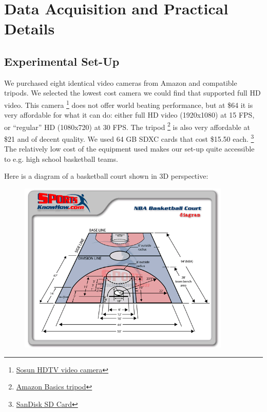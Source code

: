 \documentclass{article}
\begin{document}
\newpage
\section{Data Acquisition and Practical Details}
\subsection{Experimental Set-Up}
We purchased eight identical video cameras from Amazon and compatible tripods.
We selected the lowest cost camera we could find that supported full HD video.
This camera
\footnote{
\href{https://www.amazon.com/Camcorder-SOSUN-Rotatable-Batteries-301S-Plus/dp/B07CZ3WXYX/ref=sr_1_1?ie=UTF8&qid=1545104673&sr=8-1&keywords=sosun}
{Sosun HDTV video camera}}
does not offer world beating performance, but at \$64 it is very affordable for what it can do: 
either full HD video (1920x1080) at 15 FPS, or ``regular'' HD (1080x720) at 30 FPS.
The tripod 
\footnote{\href{https://www.amazon.com/gp/product/B005KP473Q/ref=oh_aui_detailpage_o04_s01?ie=UTF8&psc=1}
{Amazon Basics tripod}}
is also very affordable at \$21 and of decent quality.
We used 64 GB SDXC cards that cost \$15.50 each.
\footnote{
\href{https://www.amazon.com/gp/product/B00CXI1EI4/ref=oh_aui_detailpage_o06_s00?ie=UTF8&psc=1}
{SanDisk SD Card}}
The relatively low cost of the equipment used makes our set-up quite accessible to e.g. high school basketball teams.

Here is a diagram of a basketball court shown in 3D perspective:
\begin{figure}[H]
\centering
\includegraphics[width=0.90\textwidth]{NBA-court-diagram.png}
\end{figure}
\end{document}

